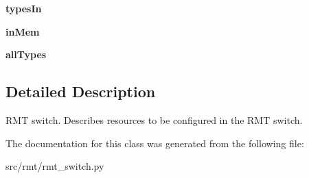 \begin{DoxyCompactItemize}
\item 
\hypertarget{classmapper_1_1src_1_1rmt_1_1rmt__switch_1_1_rmt_switch_ac8cec82aaa73d4de3da83d6458cd0d80}{}{\bfseries types\+In}\label{classmapper_1_1src_1_1rmt_1_1rmt__switch_1_1_rmt_switch_ac8cec82aaa73d4de3da83d6458cd0d80}

\item 
\hypertarget{classmapper_1_1src_1_1rmt_1_1rmt__switch_1_1_rmt_switch_abe3092e1a6af45b2539e26fa665b043f}{}{\bfseries in\+Mem}\label{classmapper_1_1src_1_1rmt_1_1rmt__switch_1_1_rmt_switch_abe3092e1a6af45b2539e26fa665b043f}

\item 
\hypertarget{classmapper_1_1src_1_1rmt_1_1rmt__switch_1_1_rmt_switch_add05d377ef0baa7c05f4876f18f7fa60}{}{\bfseries all\+Types}\label{classmapper_1_1src_1_1rmt_1_1rmt__switch_1_1_rmt_switch_add05d377ef0baa7c05f4876f18f7fa60}

\end{DoxyCompactItemize}


\subsection{Detailed Description}
\begin{DoxyVerb}RMT switch. Describes resources to be configured in the RMT switch.
\end{DoxyVerb}
 

The documentation for this class was generated from the following file\+:\begin{DoxyCompactItemize}
\item 
src/rmt/rmt\+\_\+switch.\+py\end{DoxyCompactItemize}
